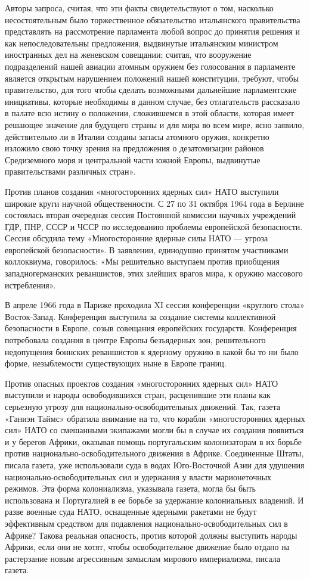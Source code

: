 \documentclass[12pt, a4paper, openany]{book}
\begin{document}
	Авторы запроса, считая, что эти факты свидетельствуют о том, насколько несостоятельным было торжественное обязательство итальянского правительства представлять на рассмотрение парламента любой вопрос до принятия решения и как непоследовательны предложения, выдвинутые итальянским министром иностранных дел на женевском совещании; считая, что вооружение подразделений нашей авиации атомным оружием без голосования в парламенте является открытым нарушением положений нашей конституции, требуют, чтобы правительство, для того чтобы сделать возможными дальнейшие парламентские инициативы, которые необходимы в данном случае, без отлагательств рассказало в палате всю истину о положении, сложившемся в этой области, которая имеет решающее значение для будущего страны и для мира во всем мире, ясно заявило, действительно ли в Италии созданы запасы атомного оружия, конкретно изложило свою точку зрения на предложения о дезатомизации районов Средиземного моря и центральной части южной Европы, выдвинутые правительствами различных стран».
	
	Против планов создания «многосторонних ядерных сил» НАТО выступили широкие круги научной общественности. С 27 по 31 октября 1964 года в Берлине состоялась вторая очередная сессия Постоянной комиссии научных учреждений ГДР, ПНР, СССР и ЧССР по исследованию проблемы европейской безопасности. Сессия обсудила тему «Многосторонние ядерные силы НАТО — угроза европейской безопасности». В заявлении, единодушно принятом участниками коллоквиума, говорилось: «Мы решительно выступаем против приобщения западногерманских реваншистов, этих злейших врагов мира, к оружию массового истребления».
	
	В апреле 1966 года в Париже проходила XI сессия конференции «круглого стола» Восток-Запад. Конференция выступила за создание системы коллективной безопасности в Европе, созыв совещания европейских государств. Конференция потребовала создания в центре Европы безъядерных зон, решительного недопущения боннских реваншистов к ядерному оружию в какой бы то ни было форме, незыблемости существующих ныне в Европе границ.
	
	Против опасных проектов создания «многосторонних ядерных сил» НАТО выступили и народы освободившихся стран, расценившие эти планы как серьезную угрозу для национально-освободительных движений. Так, газета «Ганиэн Таймс» обратила внимание на то, что корабли «многосторонних ядерных сил» НАТО со смешанными экипажами могли бы в случае их создания появиться и у берегов Африки, оказывая помощь португальским колонизаторам в их борьбе против национально-освободительного движения в Африке. Соединенные Штаты, писала газета, уже использовали суда в водах Юго-Восточной Азии для удушения национально-освободительных сил и удержания у власти марионеточных режимов. Эта форма колониализма, указывала газета, могла бы быть использована и Португалией в ее борьбе за удержание колониальных владений. И разве военные суда НАТО, оснащенные ядерными ракетами не будут эффективным средством для подавления национально-освободительных сил в Африке? Такова реальная опасность, против которой должны выступить народы Африки, если они не хотят, чтобы освободительное движение было отдано на растерзание новым агрессивным замыслам мирового империализма, писала газета.
	
\end{document}
